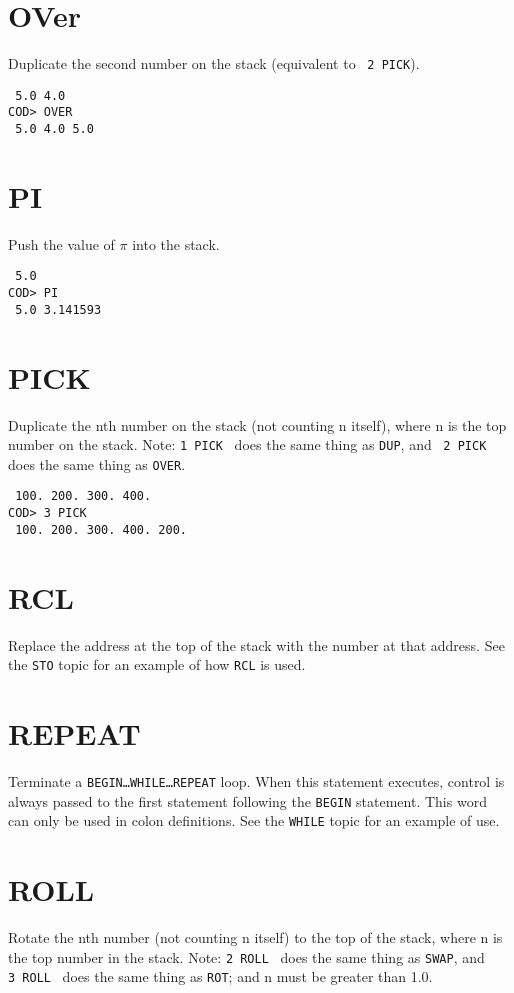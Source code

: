 \section*{OVer}
Duplicate the second number on the stack
(equivalent to \, {\tt 2~PICK}).

\medskip
{}
\begin{verbatim}
 5.0 4.0
COD> OVER
 5.0 4.0 5.0
\end{verbatim}

\section*{PI}
Push the value of $\pi$ into the stack.

\medskip
{}
\begin{verbatim}
 5.0
COD> PI
 5.0 3.141593
\end{verbatim}

\section*{PICK}
Duplicate the nth number on the stack (not counting n itself),
where n is the top number on the stack.
Note: {\tt 1~PICK} \, does the same thing as {\tt DUP},
and \, {\tt 2~PICK} \, does the same thing as {\tt OVER}.

\medskip
{}
\begin{verbatim}
 100. 200. 300. 400.
COD> 3 PICK
 100. 200. 300. 400. 200.
\end{verbatim}

\section*{RCL}
Replace the address at the top of the stack with the number at that address.
See the {\tt STO} topic for an example of how {\tt RCL} is used.

\section*{REPEAT}
Terminate a {\tt BEGIN\ldots WHILE\ldots REPEAT} loop.
When this statement executes,
control is always passed to the first statement
following the {\tt BEGIN} statement.
This word can only be used in colon definitions.
See the {\tt WHILE} topic for an example of use.

\section*{ROLL}
Rotate the nth number (not counting n itself) to the top of the stack,
where n is the top number in the stack.
Note: {\tt 2~ROLL} \, does the same thing as {\tt SWAP},
and \, {\tt 3~ROLL} \, does the same thing as {\tt ROT};
and n must be greater than 1.0.

